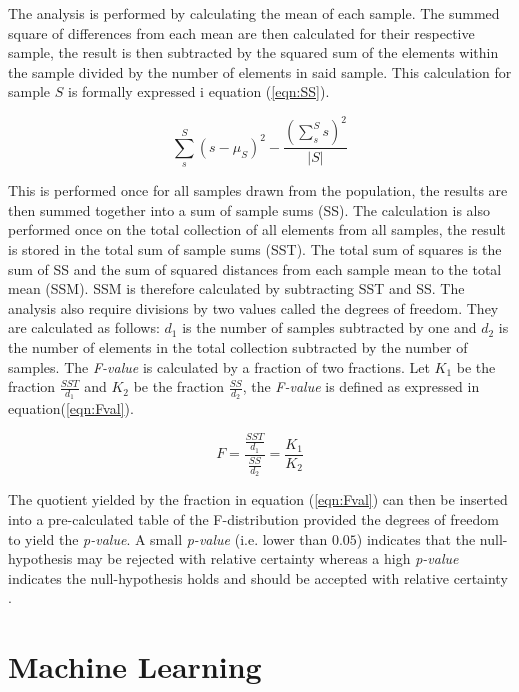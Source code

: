The analysis is performed by calculating the mean of each sample. The summed square of differences from each mean are then calculated for their respective sample, the result is then subtracted by the squared sum of the elements within the sample divided by the number of elements in said sample. This calculation for sample $S$ is formally expressed i equation (\ref{eqn:SS}).

\begin{equation}
\label{eqn:SS}
 \sum_s^S (s - \mu_S)^2 - \frac{(\sum_{s}^{S} s)^2}{|S|} 
\end{equation}

This is performed once for all samples drawn from the population, the results are then summed together into a sum of sample sums (SS). The calculation is also performed once on the total collection of all elements from all samples, the result is stored in the total sum of sample sums (SST). The total sum of squares is the sum of SS and the sum of squared distances from each sample mean to the total mean (SSM). SSM is therefore calculated by subtracting SST and SS. The analysis also require divisions by two values called the degrees of freedom. They are calculated as follows: $d_1$ is the number of samples subtracted by one and $d_2$ is the number of elements in the total collection subtracted by the number of samples. The \textit{F-value} is calculated by a fraction of two fractions. Let  $K_1$ be the fraction $\frac{SST}{d_1}$ and $K_2$ be the fraction $\frac{SS}{d_2}$, the \textit{F-value} is defined as expressed in equation(\ref{eqn:Fval}).

\begin{equation}
\label{eqn:Fval}
 F = \frac{\frac{SST}{d_1}}{\frac{SS}{d_2}} = \frac{K_1}{K_2}
\end{equation}

The quotient yielded by the fraction in equation (\ref{eqn:Fval}) can then be inserted into a pre-calculated table of the F-distribution provided the degrees of freedom to yield the \textit{p-value}. A small \textit{p-value} (i.e. lower than $0.05$) indicates that the null-hypothesis may be rejected with relative certainty whereas a high \textit{p-value} indicates the null-hypothesis holds and should be accepted with relative certainty \cite{lowry2014concepts}.


\section{Machine Learning}

